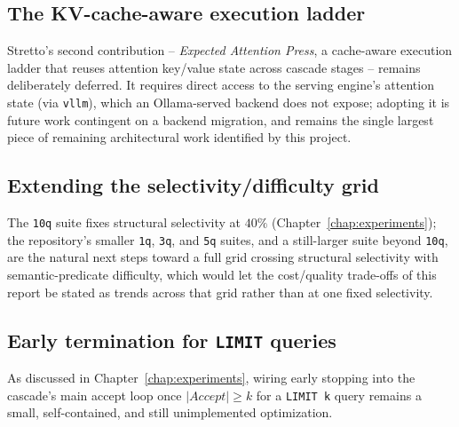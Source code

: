 \subsection{The KV-cache-aware execution ladder}
\label{sec:future-kv-cache}
Stretto's second contribution -- \emph{Expected Attention Press}, a
cache-aware execution ladder that reuses attention key/value state
across cascade stages -- remains deliberately deferred. It requires
direct access to the serving engine's attention state (\eg via
\texttt{vllm}), which an Ollama-served backend does not expose; adopting
it is future work contingent on a backend migration, and remains the
single largest piece of remaining architectural work identified by this
project.

\subsection{Extending the selectivity/difficulty grid}
\label{sec:future-ablation}
The \texttt{10q} suite fixes structural selectivity at $40\%$
(Chapter~\ref{chap:experiments}); the repository's smaller \texttt{1q},
\texttt{3q}, and \texttt{5q} suites, and a still-larger suite beyond
\texttt{10q}, are the natural next steps toward a full grid crossing
structural selectivity with semantic-predicate difficulty, which would
let the cost/quality trade-offs of this report be stated as trends
across that grid rather than at one fixed selectivity.

\subsection{Early termination for \texttt{LIMIT} queries}
As discussed in Chapter~\ref{chap:experiments}, wiring early stopping
into the cascade's main accept loop once $|\mathit{Accept}| \ge k$ for a
\texttt{LIMIT k} query remains a small, self-contained, and still
unimplemented optimization.

